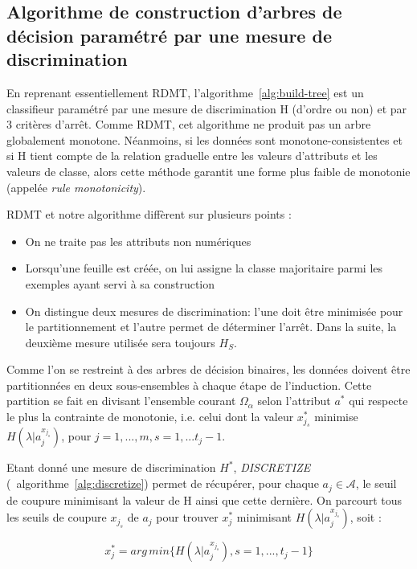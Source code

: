 \documentclass[a4paper]{article}
\newcommand{\algoref}[1]{algorithme~\ref{#1}}
\begin{document}
\subsection{Algorithme de construction d'arbres de décision paramétré par une
mesure de discrimination}

En reprenant essentiellement RDMT, l'\algoref{alg:build-tree} est un
classifieur paramétré par une mesure de discrimination H (d'ordre ou non) et par
3 critères d'arrêt. Comme RDMT, cet algorithme ne produit pas un arbre
globalement monotone. Néanmoins, si les données sont monotone-consistentes et si
H tient compte de la relation graduelle entre les valeurs d'attributs et les
valeurs de classe, alors cette méthode garantit une forme plus faible de
monotonie (appelée \emph{rule monotonicity}). 

RDMT et notre algorithme diffèrent sur plusieurs points :
\begin{itemize}
    \item On ne traite pas les attributs non numériques
    \item Lorsqu'une feuille est créée, on lui assigne la classe majoritaire parmi les exemples ayant servi à sa
construction
    \item On distingue deux mesures de discrimination: l'une doit
être minimisée pour le partitionnement et l'autre permet de déterminer l'arrêt. Dans la suite, la deuxième mesure utilisée sera toujours $H_S$.
\end{itemize}

Comme l'on se restreint à des arbres de décision binaires, les données doivent
être partitionnées en deux sous-ensembles à chaque étape de l'induction. Cette
partition se fait en divisant l'ensemble courant $\Omega_{\alpha}$ selon
l'attribut $a^*$ qui respecte le plus la contrainte de monotonie, i.e. celui
dont la valeur $x^*_{j_s}$ minimise $H(\lambda|a^{x_{j_s}}_j)$, pour $j=1,...,m,
s=1,...t_j-1$. 

Etant donné une mesure de discrimination $H^*$, \emph{DISCRETIZE}
(~\algoref{alg:discretize}) permet de récupérer, pour chaque $a_j \in
\mathcal{A}$, le seuil de coupure minimisant la valeur de H ainsi que cette
dernière. On parcourt tous les seuils de coupure $x_{j_s}$ de $a_j$
pour trouver $x^*_{j}$ minimisant $H(\lambda|a^{x_{j_s}}_j)$, soit :

$$ x^*_{j} = arg\,min \{H(\lambda|a^{x_{j_s}}_j), s=1,...,t_j -1\}$$
\end{document}
